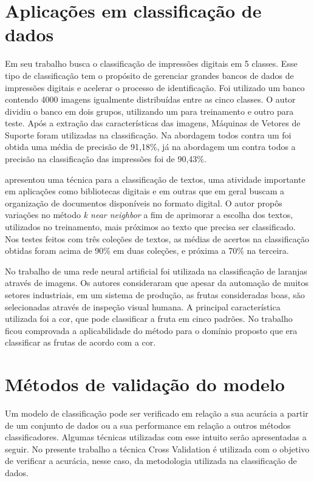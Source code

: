 \section{Aplicações em classificação de dados}
Em seu trabalho  busca o classificação de impressões digitais em 5 classes. Esse tipo de classificação tem o propósito de gerenciar grandes bancos de dados de impressões digitais e acelerar o processo de identificação. Foi utilizado um banco contendo 4000 imagens igualmente distribuídas entre as cinco classes. O autor dividiu o banco em dois grupos, utilizando um para treinamento e outro para teste. Após a extração das características das imagens, Máquinas de Vetores de Suporte foram utilizadas na classificação. Na abordagem todos contra um foi obtida uma média de precisão de 91,18\%, já na abordagem um contra todos a precisão na classificação das impressões foi de 90,43\%.

 apresentou uma técnica para a classificação de textos, uma atividade importante em aplicações como bibliotecas digitais e em outras que em geral buscam a organização de documentos disponíveis no formato digital. O autor propôs variações no método \textit{k near neighbor} a fim de  aprimorar a escolha dos textos, utilizados no treinamento, mais próximos ao texto que precisa ser classificado. Nos testes feitos com três coleções de textos, as médias de acertos na classificação obtidas foram acima de 90\% em duas coleções, e próxima a 70\% na terceira.

No trabalho de  uma rede neural artificial foi utilizada na classificação de laranjas através de imagens. Os autores consideraram que apesar da automação de muitos setores industriais, em um sistema de produção, as frutas consideradas boas, são selecionadas através de inspeção visual humana. A principal característica utilizada foi a cor, que pode classificar a fruta em cinco padrões. No trabalho ficou comprovada a aplicabilidade do método para o domínio proposto que era classificar as frutas de acordo com a cor.

\section{Métodos de validação do modelo}
Um modelo de classificação pode ser verificado em relação a sua acurácia a partir de um conjunto de dados ou a sua performance em relação a outros métodos classificadores. Algumas técnicas utilizadas com esse intuito serão apresentadas a seguir. No presente trabalho a técnica Cross Validation é utilizada com o objetivo de verificar a acurácia, nesse caso, da metodologia utilizada na classificação de dados.

